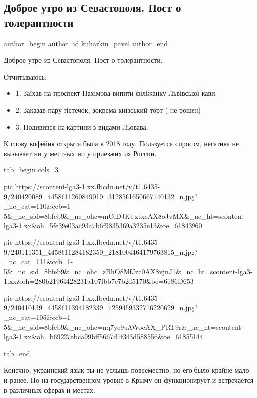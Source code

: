  
 
 
 
 
 
\subsection{Доброе утро из Севастополя. Пост о толерантности}
\label{sec:22_08_2021.fb.kuharkin_pavel.1.sevastopol_torelantnost}
 
\ifcmt
 author_begin
   author_id kuharkin_pavel
 author_end
\fi

Доброе утро из Севастополя. Пост о толерантности.  

Отчитываюсь:

\begin{itemize}
  \item 1. Заїхав на проспект Нахімова випити філіжанку Львівської кави. 
  \item 2. Заказав пару тістечок, зокрема київський торт ( не рошен)
  \item 3. Подивився на картини з видами Льовава. 
\end{itemize}

К слову кофейня открыта была в 2018 году. Пользуется спросом, негатива не
вызывает ни у местных ни у приезжих их России.

\ifcmt
   tab_begin cols=3
 
      pic https://scontent-lga3-1.xx.fbcdn.net/v/t1.6435-9/240420089_4458611260849019_3128561650667140132_n.jpg?_nc_cat=110&ccb=1-5&_nc_sid=8bfeb9&_nc_ohc=mOiDJKUztxcAX8oJvMX&_nc_ht=scontent-lga3-1.xx&oh=5fe39e03ac93a7b6f9835369a3235e13&oe=61843960
 
      pic https://scontent-lga3-1.xx.fbcdn.net/v/t1.6435-9/240111351_4458611284182350_2181004464179763815_n.jpg?_nc_cat=111&ccb=1-5&_nc_sid=8bfeb9&_nc_ohc=zBhO8MfJzc0AX8vjnJ1&_nc_ht=scontent-lga3-1.xx&oh=280b21964428231a107fbb7e7b2d5170&oe=6186D653

      pic https://scontent-lga3-1.xx.fbcdn.net/v/t1.6435-9/240410139_4458611394182339_7259459332716220629_n.jpg?_nc_cat=105&ccb=1-5&_nc_sid=8bfeb9&_nc_ohc=nq7ye9uAWocAX_PRT9r&_nc_ht=scontent-lga3-1.xx&oh=b69227ebca99bff5667d1f343d588556&oe=61855144
 
   tab_end
\fi

Конечно, украинский язык ты не услышь повсеместно, но его было крайне мало и
ранее. Но на государственном уровне в Крыму он функционирует и встречается в
различных сферах и местах.

